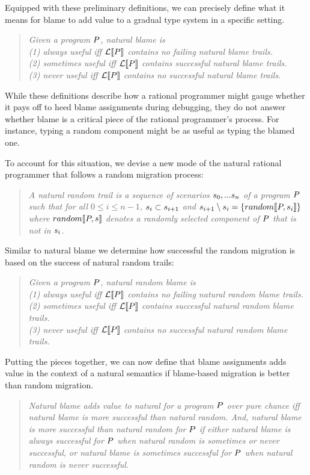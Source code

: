 Equipped with these preliminary definitions, we can precisely define what it means
for blame to add value to a gradual type system in a specific setting. 
\begin{quote}
\it
Given a program $P$, natural blame is\\
(1) \emph{always useful} iff $\mathcal{L}\llbracket P\rrbracket$ contains no failing natural blame trails.\\
(2) \emph{sometimes useful} iff $\mathcal{L}\llbracket P\rrbracket$ contains successful natural blame trails.\\
(3) \emph{never useful} iff $\mathcal{L}\llbracket P\rrbracket$ contains no successful natural blame
trails.\\
\end{quote}

While these definitions describe how a rational programmer might gauge whether it
pays off to heed blame assignments during debugging, they do not answer whether
blame is a critical piece of the rational programmer's process.  For instance,
typing a random component might be as useful as typing the blamed one.

To account for this situation, we devise a new mode of the natural rational
programmer that follows a random migration process:
\begin{quote}
\it A natural random trail is a sequence of scenarios $s_0,...s_n$ of a
program $P$ such that for all $0 \leq i \leq n - 1$, $s_i \subset
s_{i+1}$ and $s_{i+1} \setminus s_i = \{random\llbracket P, s_i\rrbracket\}$
where $random\llbracket P, s\rrbracket$ denotes a randomly selected component of $P$
that is not in $s_i$.
\end{quote}
Similar to natural blame we determine how successful the random
migration is based on the success of natural random trails: 
\begin{quote}
\it
Given a program $P$, natural random blame is\\
(1) \emph{always useful} iff $\mathcal{L}\llbracket P\rrbracket$ contains no failing natural random blame trails.\\
(2) \emph{sometimes useful} iff $\mathcal{L}\llbracket P\rrbracket$ contains successful natural random blame trails.\\
(3) \emph{never useful} iff $\mathcal{L}\llbracket P\rrbracket$ contains no successful natural
random blame trails.\\
\end{quote}

Putting the pieces together, we can now define that blame assignments adds value in
the context of a natural semantics if blame-based migration is better than random
migration.
\begin{quote}
\it Natural blame adds value to natural for a program $P$ over pure chance iff
  natural blame is more successful than natural random. And, natural blame is more
  successful than natural random for $P$ if either natural blame is always
  successful for $P$ when natural random is sometimes or never successful, or
  natural blame is sometimes successful for $P$ when natural random is never
  successful.
\end{quote}


